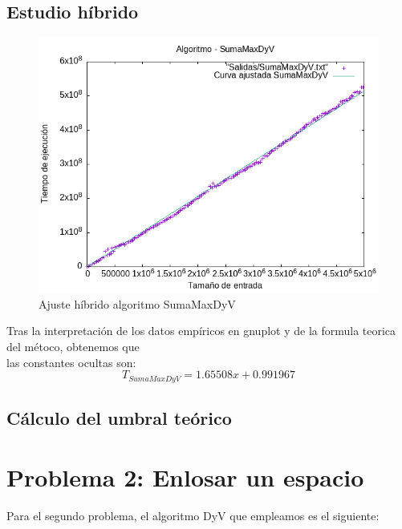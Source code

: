 \documentclass[11pt,openany]{book}
\begin{document}
\subsection{Estudio híbrido}
\begin{center}
      \begin{figure}[h]
            \centering
            \includegraphics[width=0.7\linewidth]{assets/Img/SumaMaxDyV_hib.png}
            \caption{Ajuste híbrido algoritmo SumaMaxDyV}
            \label{fig:sumaMax}
      \end{figure}
\end{center}
Tras la interpretación de los datos empíricos en gnuplot y de la formula teorica del métoco, obtenemos que \\
las constantes ocultas son:
\begin{equation*}
      T_{SumaMaxDyV}=1.65508x + 0.991967
\end{equation*}
\subsection{Cálculo del umbral teórico}

\newpage
\section{Problema 2: Enlosar un espacio }
Para el segundo problema, el algoritmo DyV que empleamos es el siguiente:
\end{document}
